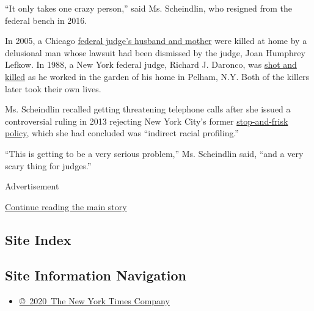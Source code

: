 ``It only takes one crazy person,'' said Ms. Scheindlin, who resigned
from the federal bench in 2016.

In 2005, a Chicago
\href{https://www.nytimes.com/2005/03/11/us/electrician-says-in-suicide-note-that-he-killed-judges-family.html}{federal
judge's husband and mother} were killed at home by a delusional man
whose lawsuit had been dismissed by the judge, Joan Humphrey Lefkow. In
1988, a New York federal judge, Richard J. Daronco, was
\href{https://www.nytimes.com/1988/05/22/nyregion/federal-judge-slain-by-a-gunman-in-westchester.html}{shot
and killed} as he worked in the garden of his home in Pelham, N.Y. Both
of the killers later took their own lives.

Ms. Scheindlin recalled getting threatening telephone calls after she
issued a controversial ruling in 2013 rejecting New York City's former
\href{https://www.nytimes.com/2013/08/13/nyregion/stop-and-frisk-practice-violated-rights-judge-rules.html}{stop-and-frisk
policy}, which she had concluded was ``indirect racial profiling.''

``This is getting to be a very serious problem,'' Ms. Scheindlin said,
``and a very scary thing for judges.''

Advertisement

\protect\hyperlink{after-bottom}{Continue reading the main story}

\hypertarget{site-index}{%
\subsection{Site Index}\label{site-index}}

\hypertarget{site-information-navigation}{%
\subsection{Site Information
Navigation}\label{site-information-navigation}}

\begin{itemize}
\tightlist
\item
  \href{https://help.nytimes.com/hc/en-us/articles/115014792127-Copyright-notice}{©~2020~The
  New York Times Company}
\end{itemize}


